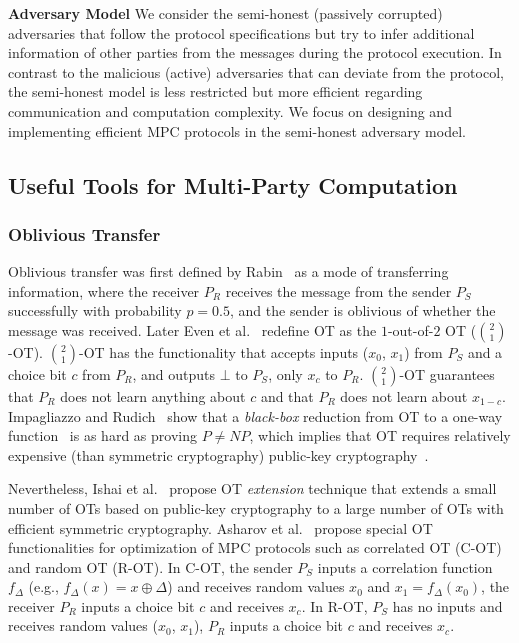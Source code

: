 \textbf{Adversary Model}
We consider the semi-honest (passively corrupted)~\cite[Chapter~2]{evans2017pragmatic} adversaries that follow the protocol specifications but try to infer additional information of other parties from the messages during the protocol execution. In contrast to the malicious (active) adversaries that can deviate from the protocol, the semi-honest model is less restricted but more efficient regarding communication and computation complexity. We focus on designing and implementing efficient MPC protocols in the semi-honest adversary model.

\subsection{Useful Tools for Multi-Party Computation}
\subsubsection{Oblivious Transfer}
\label{subsubsec:OT}
Oblivious transfer was first defined by Rabin~\cite{rabinOT1981} as a mode of transferring information, where the receiver $P_R$ receives the message from the sender $P_S$ successfully with probability $p=0.5$, and the sender is oblivious of whether the message was received.
Later Even et al.~\cite{even1985} redefine OT as the $1$-out-of-$2$ OT ($\binom{2}{1}$-OT). $\binom{2}{1}$-OT has the functionality that accepts inputs ($x_0$, $x_1$) from $P_S$ and a choice bit $c$ from $P_R$, and outputs $\bot $ to $P_S$, only $x_c$ to $P_R$. $\binom{2}{1}$-OT guarantees that $P_R$ does not learn anything about $c$ and that $P_R$ does not learn about $x_{1-c}$.
Impagliazzo and Rudich~\cite{Russel1990} show that a \textit{black-box} reduction from OT to a one-way function~\cite[Chapter~2]{oded2006foundations} is as hard as proving $P\neq NP$, which implies that OT requires relatively expensive (than symmetric cryptography) public-key cryptography~\cite{rivest1978method}.

Nevertheless, Ishai et al.~\cite{IKNP03} propose OT \textit{extension} technique that extends a small number of OTs based on public-key cryptography to a large number of OTs with efficient symmetric cryptography. Asharov et al.~\cite{asharov2017more} propose special OT functionalities for optimization of MPC protocols such as correlated OT (C-OT) and random OT (R-OT). In C-OT, the sender $P_S$ inputs a correlation function $f_{\Delta }$ (e.g., $f_{\Delta }\left(x\right)=x\oplus \Delta $) and receives random values $x_0$ and $x_1=f_{\Delta }\left(x_0\right)$, the receiver $P_R$ inputs a choice bit $c$ and receives $x_{c}$. In R-OT, $P_S$ has no inputs and receives random values ($x_0$, $x_1$), $P_R$ inputs a choice bit $c$ and receives $x_c$.

